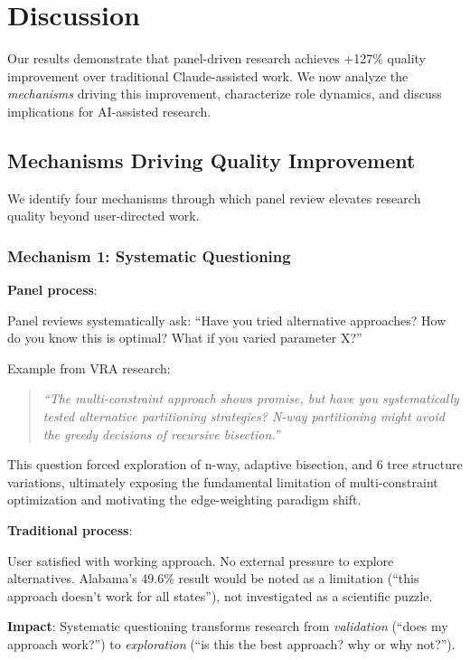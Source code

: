 \section{Discussion}
\label{sec:discussion}

Our results demonstrate that panel-driven research achieves +127\% quality improvement over traditional Claude-assisted work. We now analyze the \emph{mechanisms} driving this improvement, characterize role dynamics, and discuss implications for AI-assisted research.

\subsection{Mechanisms Driving Quality Improvement}

We identify four mechanisms through which panel review elevates research quality beyond user-directed work.

\subsubsection{Mechanism 1: Systematic Questioning}

\textbf{Panel process}:

Panel reviews systematically ask: ``Have you tried alternative approaches? How do you know this is optimal? What if you varied parameter X?''

Example from VRA research:
\begin{quote}
\textit{``The multi-constraint approach shows promise, but have you systematically tested alternative partitioning strategies? N-way partitioning might avoid the greedy decisions of recursive bisection.''}
\end{quote}

This question forced exploration of n-way, adaptive bisection, and 6 tree structure variations, ultimately exposing the fundamental limitation of multi-constraint optimization and motivating the edge-weighting paradigm shift.

\textbf{Traditional process}:

User satisfied with working approach. No external pressure to explore alternatives. Alabama's 49.6\% result would be noted as a limitation (``this approach doesn't work for all states''), not investigated as a scientific puzzle.

\textbf{Impact}: Systematic questioning transforms research from \emph{validation} (``does my approach work?'') to \emph{exploration} (``is this the best approach? why or why not?'').

